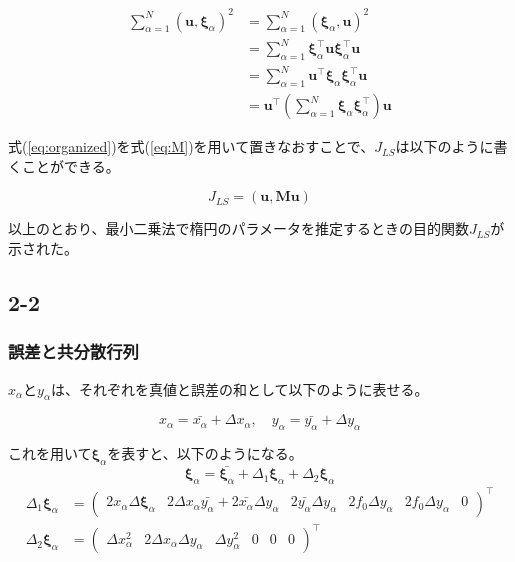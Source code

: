 \documentclass[12pt,a4j]{jsarticle}
\newcommand{\xa}{x_\alpha}
\newcommand{\ya}{y_\alpha}
\newcommand{\xia}{\bm{\xi}_\alpha}
\begin{document}
  \begin{align}
    \sum_{\alpha = 1}^N (\bm{u}, \xia)^2 &= \sum_{\alpha = 1}^N (\xia, \bm{u})^2 \nonumber \\
     &= \sum_{\alpha = 1}^N \xia^\top \bm{u} \xia^\top \bm{u} \nonumber \\
     &= \sum_{\alpha = 1}^N \bm{u}^\top \xia \xia^\top \bm{u} \nonumber \\
     &= \bm{u}^\top \left(\sum_{\alpha = 1}^N \xia \xia^\top \right) \bm{u} \label{eq:organized}
  \end{align}

  式(\ref{eq:organized})を式(\ref{eq:M})を用いて置きなおすことで、$J_{LS}$は以下のように書くことができる。

  \begin{equation}
    J_{LS} = (\bm{u}, \bm{Mu})
  \end{equation}

  以上のとおり、最小二乗法で楕円のパラメータを推定するときの目的関数$J_{LS}$が示された。

  \subsection*{2-2}
    \subsubsection*{誤差と共分散行列}
      $\xa$と$\ya$は、それぞれを真値と誤差の和として以下のように表せる。

      \begin{equation}
        \xa = \bar{\xa} + \Delta \xa, \quad \ya = \bar{\ya} + \Delta \ya
      \end{equation}

      これを用いて$\xia$を表すと、以下のようになる。
      \begin{equation}
        \xia = \bar{\xia} + \Delta_1\xia + \Delta_2\xia
      \end{equation}
      \begin{align}
        \Delta_1\xia &= \begin{pmatrix}2\xa\Delta\xia & 2\Delta\xa\bar{\ya} + 2\bar{\xa}\Delta\ya & 2\bar{\ya}\Delta\ya & 2f_0\Delta\ya & 2f_0\Delta\ya & 0\end{pmatrix}^\top \\
        \Delta_2\xia &= \begin{pmatrix}\Delta\xa^2 & 2\Delta\xa\Delta\ya & \Delta\ya^2 & 0 & 0 & 0 \end{pmatrix}^\top
      \end{align}
\end{document}
